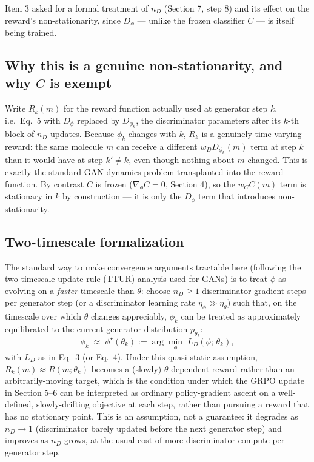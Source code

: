 \documentclass[11pt]{article}
\newcommand{\1}{\mathbb{1}}
\begin{document}
Item 3 asked for a formal treatment of $n_D$ (Section 7, step 8) and
its effect on the reward's non-stationarity, since $D_\phi$ --- unlike
the frozen classifier $C$ --- is itself being trained.

\subsection{Why this is a genuine non-stationarity, and why $C$ is exempt}
Write $R_k(m)$ for the reward function actually used at generator
step $k$, i.e.\ Eq.~5 with $D_\phi$ replaced by $D_{\phi_k}$, the
discriminator parameters after its $k$-th block of $n_D$ updates.
Because $\phi_k$ changes with $k$, $R_k$ is a genuinely time-varying
reward: the same molecule $m$ can receive a different $w_D
D_{\phi_k}(m)$ term at step $k$ than it would have at step $k' \ne k$,
even though nothing about $m$ changed. This is exactly the standard
GAN dynamics problem transplanted into the reward function. By
contrast $C$ is frozen ($\nabla_\phi C = 0$, Section 4), so the
$w_C C(m)$ term is stationary in $k$ by construction --- it is only
the $D_\phi$ term that introduces non-stationarity.

\subsection{Two-timescale formalization}
The standard way to make convergence arguments tractable here
(following the two-timescale update rule (TTUR) analysis used for
GANs) is to treat $\phi$ as evolving on a \emph{faster} timescale than
$\theta$: choose $n_D \ge 1$ discriminator gradient steps per
generator step (or a discriminator learning rate $\eta_\phi \gg
\eta_\theta$) such that, on the timescale over which $\theta$ changes
appreciably, $\phi_k$ can be treated as approximately equilibrated to
the current generator distribution $p_{\theta_k}$:
\begin{equation}
\phi_k \;\approx\; \phi^\star(\theta_k) := \arg\min_\phi \; L_D(\phi;\, \theta_k),
\label{eq:ttur}
\end{equation}
with $L_D$ as in Eq.~3 (or Eq.~4). Under this quasi-static assumption,
$R_k(m) \approx R(m;\theta_k)$ becomes a (slowly) $\theta$-dependent
reward rather than an arbitrarily-moving target, which is the
condition under which the GRPO update in Section 5--6 can be
interpreted as ordinary policy-gradient ascent on a well-defined,
slowly-drifting objective at each step, rather than pursuing a
reward that has no stationary point. This is an assumption, not a
guarantee: it degrades as $n_D \to 1$ (discriminator barely updated
before the next generator step) and improves as $n_D$ grows, at the
usual cost of more discriminator compute per generator step.
\end{document}
